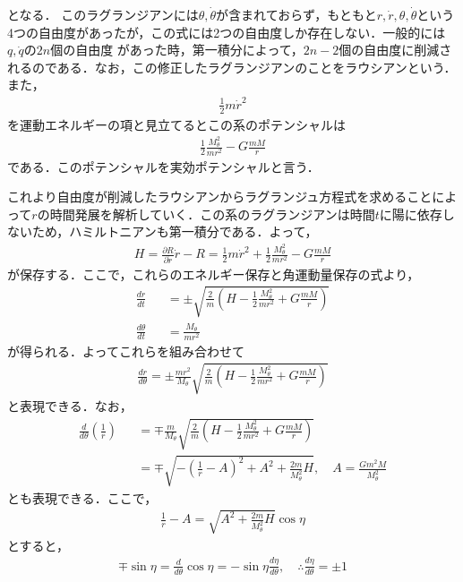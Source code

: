 \documentclass[12pt,dvipdfmx]{jsarticle}
\begin{document}
となる．
このラグランジアンには$\theta,\dot{\theta}$が含まれておらず，もともと$r,\dot{r},\theta,\dot{\theta}$という4つの自由度があったが，この式には2つの自由度しか存在しない．一般的には$q,\dot{q}$の$2n$個の自由度
があった時，第一積分によって，$2n-2$個の自由度に削減されるのである．なお，この修正したラグランジアンのことをラウシアンという．また，
\begin{eqnarray}
  \frac{1}{2}m\dot{r}^2
\end{eqnarray}
を運動エネルギーの項と見立てるとこの系のポテンシャルは
\begin{eqnarray}
  \frac{1}{2}\frac{M_\theta^2}{mr^2} - G\frac{mM}{r}
\end{eqnarray}
である．このポテンシャルを実効ポテンシャルと言う．

これより自由度が削減したラウシアンからラグランジュ方程式を求めることによって$r$の時間発展を解析していく．この系のラグランジアンは時間$t$に陽に依存しないため，ハミルトニアンも第一積分である．よって，
\begin{eqnarray}
  H = \frac{\partial R}{\partial \dot{r}}\dot{r}-R = \frac{1}{2}m\dot{r}^2 + \frac{1}{2}\frac{M_\theta^2}{mr^2} - G\frac{mM}{r}
\end{eqnarray}
が保存する．ここで，これらのエネルギー保存と角運動量保存の式より，
\begin{eqnarray}
  \frac{d r}{dt} &&= \pm\sqrt{ \frac{2}{m}\left(H- \frac{1}{2}\frac{M_\theta^2}{mr^2} + G\frac{mM}{r}\right) }\\
  \frac{d\theta}{dt}&&= \frac{M_\theta}{mr^2}
\end{eqnarray}
が得られる．よってこれらを組み合わせて
\begin{eqnarray}
  \frac{dr}{d\theta} = \pm\frac{mr^2}{M_\theta }\sqrt{ \frac{2}{m}\left(H- \frac{1}{2}\frac{M_\theta^2}{mr^2} + G\frac{mM}{r}\right) }
\end{eqnarray}
と表現できる．なお，
\begin{eqnarray}
  \frac{d}{d\theta}\left( \frac{1}{r} \right) &&= \mp \frac{m}{M_\theta} \sqrt{ \frac{2}{m}\left(H- \frac{1}{2}\frac{M_\theta^2}{mr^2} + G\frac{mM}{r}\right) }\\
  &&=\mp \sqrt{ -\left( \frac{1}{r}- A \right)^2 + A^2 + \frac{2m}{M_\theta^2} H }, \quad A = \frac{Gm^2 M}{M_\theta^2}
\end{eqnarray}
とも表現できる．ここで，
\begin{eqnarray}
  \frac{1}{r}- A = \sqrt{ A^2 + \frac{2m}{M_\theta^2} H }\cos\eta
\end{eqnarray}
とすると，
\begin{eqnarray}
  \mp\sin\eta = \frac{d}{d\theta}\cos\eta = -\sin\eta \frac{d\eta}{d\theta},\quad\therefore \frac{d\eta}{d\theta} = \pm 1
\end{eqnarray}
\end{document}
